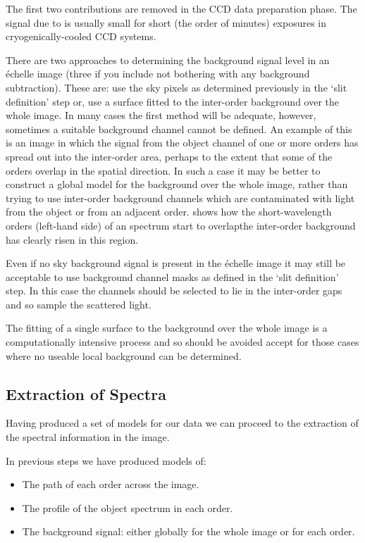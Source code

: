 The first two contributions are removed in the CCD data preparation
phase.  The signal due to  is
usually small for short (the order of minutes) exposures in
cryogenically-cooled CCD systems.

There are two approaches to determining the background signal level in
an \'{e}chelle image (three if you include not bothering with any
background subtraction).  These are: use the sky pixels as determined
previously in the `slit definition' step or, use a surface fitted to the
inter-order background over the whole image.  In many cases the first
method will be adequate, however, sometimes a suitable background channel
cannot be defined.
An example of this is an image in which the signal from the
object channel of one or more orders has spread out into the inter-order
area, perhaps to the extent that some of the orders overlap in the
spatial direction.
In such a case it may be better to construct a global model for the
background over the whole image, rather than trying to use inter-order
background channels which are contaminated with light from the object or
from an adjacent order.  
{} shows how the
short-wavelength orders (left-hand side) of an 
spectrum start to overlap\sgspec{---}{ - }the inter-order background has
clearly risen in this region.

Even if no sky background signal is present in the \'{e}chelle image it
may still be acceptable to use background channel masks as defined in
the `slit definition' step.  In this case the channels should be
selected to lie in the inter-order gaps and so sample the scattered
light.

The fitting of a single surface to the background over the whole image
is a computationally intensive process and so should be avoided accept
for those cases where no useable local background can be determined.


\subsection{\label{se_extraction}Extraction of Spectra}

Having produced a set of models for our data we can proceed to the
extraction of the spectral information in the image.

In previous steps we have produced models of:

\begin{itemize}

\item The path of each order across the image.

\item The profile of the object spectrum in each order.

\item The background signal: either globally for the whole image or
      for each order.

\end{itemize}

